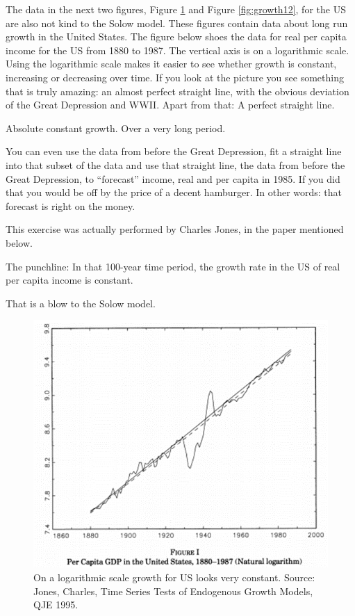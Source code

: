 \documentclass[
]{book}
\begin{document}
The data in the next two figures, Figure \ref{fig:growth11} and Figure \ref{fig:growth12}, for the US are also not kind to the Solow model. These figures contain data about long run growth in the United States. The figure below shoes the data for real per capita income for the US from 1880 to 1987. The vertical axis is on a logarithmic scale. Using the logarithmic scale makes it easier to see whether growth is constant, increasing or decreasing over time. If you look at the picture you see something that is truly amazing: an almost perfect straight line, with the obvious deviation of the Great Depression and WWII. Apart from that: A perfect straight line.

Absolute constant growth. Over a very long period.

You can even use the data from before the Great Depression, fit a straight line into that subset of the data and use that straight line, the data from before the Great Depression, to ``forecast'' income, real and per capita in 1985. If you did that you would be off by the price of a decent hamburger. In other words: that forecast is right on the money.

This exercise was actually performed by Charles Jones, in the paper mentioned below.

The punchline: In that 100-year time period, the growth rate in the US of real per capita income is constant.

That is a blow to the Solow model.

\begin{figure}

{\centering \includegraphics[width=1\linewidth]{img/growth/growth11} 

}

\caption{On a logarithmic scale growth for US looks very constant. Source: Jones, Charles, Time Series Tests of Endogenous Growth Models, QJE 1995.}\label{fig:growth11}
\end{figure}
\end{document}
